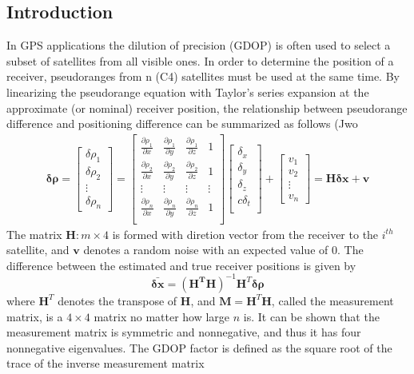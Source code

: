 \documentclass[a4paper]{report}
\begin{document}
\subsection{Introduction}
In GPS applications the dilution of precision (GDOP) is often used to select a subset of satellites from all visible ones.
In order to determine the position of a receiver, pseudoranges from n (C4) satellites must be used at the same time. By linearizing the pseudorange equation with Taylor’s series expansion at the approximate (or nominal) receiver position,
the relationship between pseudorange difference and positioning difference can be summarized as follows (Jwo
\begin{align}
\mathbf{\delta \rho}=
\left[
\begin{matrix}
\delta {\rho_1} \\
\delta {\rho_2} \\
\vdots \\
\delta{\rho_n}
\end{matrix}\right]
=
\left[
\begin{matrix}
\frac{\partial \rho_1}{\partial x} & \frac{\partial \rho_1}{\partial y} & \frac{\partial \rho_1}{\partial z} & 1 \\
\frac{\partial \rho_2}{\partial x} & \frac{\partial \rho_2}{\partial y} & \frac{\partial \rho_2}{\partial z} & 1 \\
\vdots & \vdots & \vdots & \vdots \\
\frac{\partial \rho_n}{\partial x} & \frac{\partial \rho_n}{\partial y} & \frac{\partial \rho_n}{\partial z} & 1 \\
\end{matrix}\right]
\left[
\begin{matrix}
\delta_x \\
\delta_y \\
\delta_z \\
c\delta_t \\
\end{matrix}\right]
+
\left[
\begin{matrix}
v_1 \\
v_2 \\
\vdots \\
v_n
\end{matrix}\right]=\mathbf{H}\mathbf{\delta x}+\mathbf{v}
\end{align}
The matrix $\mathbf{H}: m \times 4$ is formed with diretion vector from the receiver to the $i^{th}$ satellite, and $\mathbf{v}$ denotes a random noise with an expected value of 0. The
difference between the estimated and true receiver positions is given by
\begin{equation}
\bar{\mathbf{\delta x}}=\left(\mathbf{H^TH}\right)^{-1}\mathbf{H}^T \mathbf{\delta \rho}
\end{equation}
where $\mathbf{H}^T$ denotes the transpose of $\mathbf{H}$, and $\mathbf{M} = \mathbf{H}^T\mathbf{H}$, called the measurement matrix, is a $4 \times 4$ matrix no matter
how large $n$ is. It can be shown that the measurement matrix is symmetric and nonnegative, and thus it has four nonnegative eigenvalues. The GDOP factor is defined as the square root of the trace of the inverse measurement matrix
\end{document}
